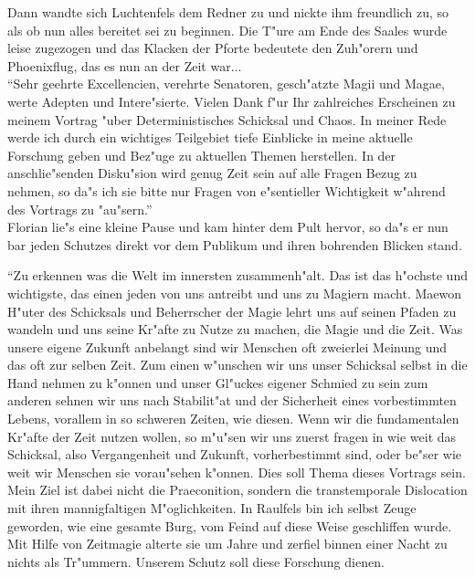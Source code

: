 \documentclass[a5paper,8pt]{book}
\begin{document}
Dann wandte sich Luchtenfels dem Redner zu und nickte ihm freundlich zu, so als ob nun alles bereitet sei zu beginnen. Die T"ure am Ende des Saales wurde leise zugezogen und das Klacken der Pforte bedeutete den Zuh"orern und Phoenixflug, das es nun an der Zeit war... \\

``Sehr geehrte Excellencien, verehrte Senatoren, gesch"atzte Magii und Magae, werte Adepten und Intere"sierte. Vielen Dank f"ur Ihr zahlreiches Erscheinen zu meinem Vortrag "uber Deterministisches Schicksal und Chaos. In meiner Rede werde ich durch ein wichtiges Teilgebiet tiefe Einblicke in meine aktuelle Forschung geben und Bez"uge zu aktuellen Themen herstellen. In der anschlie"senden Disku"sion wird genug Zeit sein auf alle Fragen Bezug zu nehmen, so da"s ich sie bitte nur Fragen von e"sentieller Wichtigkeit w"ahrend des Vortrags zu "au"sern.''\\

Florian lie"s eine kleine Pause und kam hinter dem Pult hervor, so da"s er nun bar jeden Schutzes direkt vor dem Publikum und ihren bohrenden Blicken stand.

``Zu erkennen was die Welt im innersten zusammenh"alt. Das ist das h"ochste und wichtigste, das einen jeden von uns antreibt und uns zu Magiern macht. Maewon H"uter des Schicksals und Beherrscher der Magie lehrt uns auf seinen Pfaden zu wandeln und uns seine Kr"afte zu Nutze zu machen, die Magie und die Zeit.
Was unsere eigene Zukunft anbelangt sind wir Menschen oft zweierlei Meinung und das oft zur selben Zeit. Zum einen w"unschen wir uns unser Schicksal selbst in die Hand nehmen zu k"onnen und unser Gl"uckes eigener Schmied zu sein zum anderen sehnen wir uns nach Stabilit"at und der Sicherheit eines vorbestimmten Lebens, vorallem in so schweren Zeiten, wie diesen.
Wenn wir die fundamentalen Kr"afte der Zeit nutzen wollen, so m"u"sen wir uns zuerst fragen in wie weit das Schicksal, also Vergangenheit und Zukunft, vorherbestimmt sind, oder be"ser wie weit wir Menschen sie vorau"sehen k"onnen. Dies soll Thema dieses Vortrags sein.
Mein Ziel ist dabei nicht die Praeconition, sondern die transtemporale Dislocation mit ihren mannigfaltigen M"oglichkeiten.
In Raulfels bin ich selbst Zeuge geworden, wie eine gesamte Burg, vom Feind auf diese Weise geschliffen wurde. Mit Hilfe von Zeitmagie alterte sie um Jahre und zerfiel binnen einer Nacht zu nichts als Tr"ummern. Unserem Schutz soll diese Forschung dienen.
\end{document}
